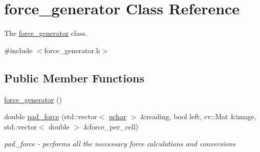 \hypertarget{classforce__generator}{\section{force\-\_\-generator Class Reference}
\label{classforce__generator}
}


The \hyperlink{classforce__generator}{force\-\_\-generator} class.  




{\ttfamily \#include $<$force\-\_\-generator.\-h$>$}

\subsection*{Public Member Functions}
\begin{DoxyCompactItemize}
\item 
\hyperlink{classforce__generator_a3701cb8875ad174408b50517c2e096f5}{force\-\_\-generator} ()
\item 
double \hyperlink{classforce__generator_a7e40f6c94c2155f5e0caf2a34685c1d7}{pad\-\_\-force} (std\-::vector$<$ \hyperlink{force__generator_8h_a65f85814a8290f9797005d3b28e7e5fc}{uchar} $>$ \&reading, bool left, cv\-::\-Mat \&image, std\-::vector$<$ double $>$ \&force\-\_\-per\-\_\-cell)
\begin{DoxyCompactList}\small\item\em pad\-\_\-force -\/ performs all the neccessary force calculations and conversions \end{DoxyCompactList}\end{DoxyCompactItemize}

